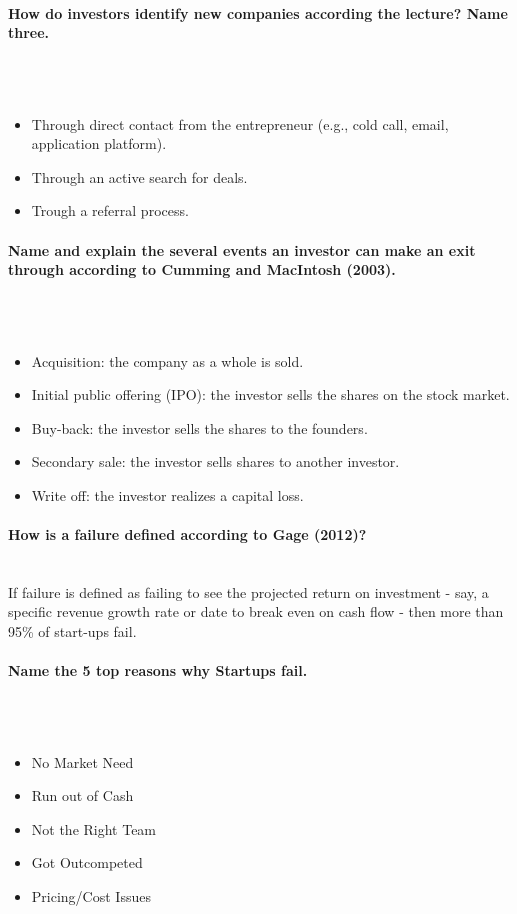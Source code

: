 \documentclass[10pt,a4paper,noendnumber=true]{scrartcl}
\newcommand{\properparagraph}[1]{\paragraph{\textcolor{Emerald}{#1}}\mbox{}\\}
\begin{document}
\properparagraph{How do investors identify new companies according the lecture? Name three.}
\\[-6ex]
\begin{itemize}
	\item Through direct contact from the entrepreneur (e.g., cold call, email, application platform).
	\item Through an active search for deals.
	\item Trough a referral process.
\end{itemize}

\properparagraph{Name and explain the several events an investor can make an exit through according to Cumming and MacIntosh (2003).}
\\[-6ex]
\begin{itemize}
	\item Acquisition: the company as a whole is sold.
	\item Initial public offering (IPO): the investor sells the
	shares on the stock market.
	\item Buy-back: the investor sells the shares to the
	founders.
	\item Secondary sale: the investor sells shares to
	another investor.
	\item Write off: the investor realizes a capital loss.
\end{itemize}

\properparagraph{How is a failure defined according to Gage (2012)?}
If failure is defined as failing to see the projected return on investment - say, a specific revenue growth rate or date to break even on cash flow - then more than 95\% of start-ups fail.

\properparagraph{Name the 5 top reasons why Startups fail.}
\\[-6ex]
\begin{itemize}
	\item No Market Need
	\item Run out of Cash
	\item Not the Right Team
	\item Got Outcompeted
	\item Pricing/Cost Issues
\end{itemize}







\newpage
\end{document}
